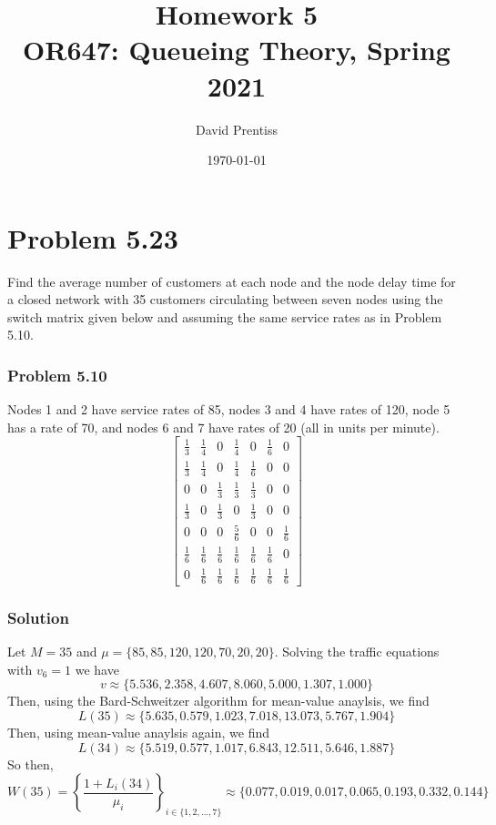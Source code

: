 \documentclass[letterpaper]{amsart}
\title[Homework 5]{Homework 5 \\ OR647: Queueing Theory, Spring 2021}
\author{David Prentiss}
\date{\today}
\begin{document}
\maketitle

\section{Problem 5.23} %
Find the average number of customers at each node and the node delay time for a closed network with 35 customers circulating between seven nodes using the switch matrix given below and assuming the same service rates as in Problem 5.10.
\subsubsection*{Problem 5.10}
Nodes 1 and 2 have service rates of 85, nodes 3 and 4 have rates of 120, node 5
has a rate of 70, and nodes 6 and 7 have rates of 20 (all in units per minute).
\begin{equation*}
  \begin{bmatrix}
    \frac{1}{3} & \frac{1}{4} & 0 & \frac{1}{4} & 0 & \frac{1}{6} & 0 \\[0.5ex]
    \frac{1}{3} & \frac{1}{4} & 0 & \frac{1}{4} & \frac{1}{6} & 0 & 0 \\[0.5ex]
    0 & 0 & \frac{1}{3} & \frac{1}{3} & \frac{1}{3} & 0 & 0 \\[0.5ex]
    \frac{1}{3} & 0 & \frac{1}{3} & 0 & \frac{1}{3} & 0 & 0 \\[0.5ex]
    0 & 0 & 0 & \frac{5}{6} & 0 & 0 & \frac{1}{6} \\[0.5ex]
    \frac{1}{6} & \frac{1}{6} & \frac{1}{6} & \frac{1}{6} & \frac{1}{6} & \frac{1}{6} & 0 \\[0.5ex]
    0 & \frac{1}{6} & \frac{1}{6} & \frac{1}{6} & \frac{1}{6} & \frac{1}{6} & \frac{1}{6}
  \end{bmatrix}
\end{equation*}
\subsubsection*{Solution}
Let $M=35$ and $\mu=\{85,85, 120, 120,70, 20, 20\}$.
Solving the traffic equations with $v_6=1$ we have
\begin{equation*}
v\approx\{5.536, 2.358, 4.607, 8.060, 5.000, 1.307, 1.000\}
\end{equation*}
Then, using the Bard-Schweitzer algorithm for mean-value anaylsis, we find
\begin{equation*}
  L(35) \approx \{5.635, 0.579, 1.023, 7.018, 13.073, 5.767, 1.904\}
\end{equation*}
Then, using mean-value anaylsis again, we find
\begin{equation*}
  L(34) \approx \{5.519, 0.577, 1.017, 6.843, 12.511, 5.646, 1.887\}
\end{equation*}
So then,
\begin{equation*}
  W(35) = \left\{\frac{1+L_i(34)}{\mu_i}\right\}_{i\in\{1,2,\dots,7\}}\approx \{0.077, 0.019, 0.017, 0.065, 0.193, 0.332, 0.144\}
\end{equation*}
\end{document}

